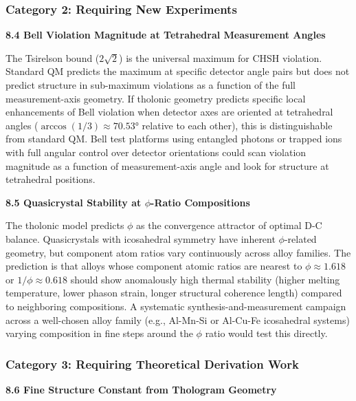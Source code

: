 \documentclass[
  11pt,
  letterpaper,
]{article}
\begin{document}
\subsubsection{Category 2: Requiring New
Experiments}\label{category-2-requiring-new-experiments}

\textbf{8.4 Bell Violation Magnitude at Tetrahedral Measurement Angles}

The Tsirelson bound (\(2\sqrt{2}\)) is the universal maximum for CHSH
violation. Standard QM predicts the maximum at specific detector angle
pairs but does not predict structure in sub-maximum violations as a
function of the full measurement-axis geometry. If tholonic geometry
predicts specific local enhancements of Bell violation when detector
axes are oriented at tetrahedral angles (\(\arccos(1/3) \approx 70.53°\)
relative to each other), this is distinguishable from standard QM. Bell
test platforms using entangled photons or trapped ions with full angular
control over detector orientations could scan violation magnitude as a
function of measurement-axis angle and look for structure at tetrahedral
positions.

\textbf{8.5 Quasicrystal Stability at \(\phi\)-Ratio Compositions}

The tholonic model predicts \(\phi\) as the convergence attractor of
optimal D-C balance. Quasicrystals with icosahedral symmetry have
inherent \(\phi\)-related geometry, but component atom ratios vary
continuously across alloy families. The prediction is that alloys whose
component atomic ratios are nearest to \(\phi \approx 1.618\) or
\(1/\phi \approx 0.618\) should show anomalously high thermal stability
(higher melting temperature, lower phason strain, longer structural
coherence length) compared to neighboring compositions. A systematic
synthesis-and-measurement campaign across a well-chosen alloy family
(e.g., Al-Mn-Si or Al-Cu-Fe icosahedral systems) varying composition in
fine steps around the \(\phi\) ratio would test this directly.

\subsubsection{Category 3: Requiring Theoretical Derivation
Work}\label{category-3-requiring-theoretical-derivation-work}

\textbf{8.6 Fine Structure Constant from Thologram Geometry}
\end{document}
